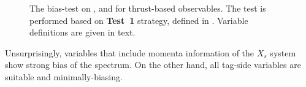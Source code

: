 \begin{figure}[htbp!]
    \ContinuedFloat
    \caption{\label{fig:thrust_variables_test1} The bias-test on \EB, \Estar and \Mbc for thrust-based observables.
    The test is performed based on \textbf{Test~1} strategy, defined in .
    Variable definitions are given in text.}
\end{figure}

Unsurprisingly, variables that include momenta information of the $X_s$ system show strong bias of the spectrum.
On the other hand, all tag-side variables are suitable and minimally-biasing.